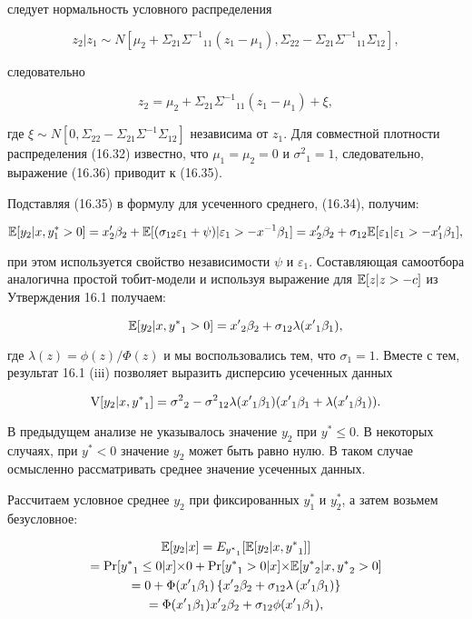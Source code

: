следует нормальность условного распределения

\[
z_2|z_1 \sim N[\mu_2+\Sigma_{21}{\Sigma^{-1}}_{11}(z_{1}-\mu_1),\Sigma_{22}-\Sigma_{21}{\Sigma^{-1}}_{11}\Sigma_{12}],
\]

следовательно

\begin{equation}
z_2=\mu_2+\Sigma_{21}{\Sigma^{-1}}_{11}(z_1-\mu_1)+\xi,
\end{equation}

где $\xi \sim N[0,\Sigma_{22}-\Sigma_{21}{\Sigma^{-1}}\Sigma_{12}]$ независима от $z_1$. Для  совместной плотности распределения (16.32) известно, что $\mu_1=\mu_2=0$ и ${\sigma^{2}}_1=1$, следовательно, выражение (16.36) приводит к  (16.35).

Подставляя (16.35) в формулу для усеченного среднего, (16.34), получим:

\[
\mathbb{E}[y_2|x,y^* _1>0]=x'_2\beta_2+\mathbb{E}[(\sigma_{12}\varepsilon_1+\psi)|\varepsilon_1>-x^{-1}\beta_1]=x'_{2}\beta_2+\sigma_{12}\mathbb{E}[\varepsilon_1|\varepsilon_1>-x'_1\beta_1],
\]
 
при этом используется свойство независимости $\psi$ и $\varepsilon_1$. Составляющая самоотбора  аналогична простой тобит-модели и используя выражение для $\mathbb{E}[z|z>{-c}]$ из Утверждения 16.1 получаем:


\begin{equation}
\mathbb{E}[y_2|x,{y^* }_1>0]={x'}_2\beta_2+\sigma_{12}\lambda({x'}_1\beta_1),
\end{equation}

где $\lambda(z)=\phi(z)/\Phi(z)$ и мы воспользовались тем, что ${\sigma}_1=1$. Вместе с тем, результат 16.1 (iii) позволяет выразить дисперсию усеченных данных

\begin{equation}
\mathrm{V}[y_2|x,{y^* }_1]={\sigma^2}_2-{\sigma^2}_{12}\lambda({x'}_1\beta_1)({x'}_1\beta_1+\lambda({x'}_1\beta_1)).
\end{equation}

В предыдущем анализе не указывалось значение $y_2$ при ${y^* } \leq 0$. В некоторых случаях, при ${y^* }<0$ значение $y_2$ может быть равно нулю. В таком случае осмысленно рассматривать среднее значение усеченных данных. 


Рассчитаем условное среднее $y_2$ при фиксированных $y^* _1$ и $y^* _2$, а затем возьмем безусловное:

\begin{multline}
\mathbb{E}[y_2|x]=E_{{y^* }_1}[\mathbb{E}[y_2|x,{y^* }_1]] \\
=\mathrm{Pr}[ {y^* }_1 \leq 0|x]{\times}0+\mathrm{Pr}[ {y^* }_1>0|x]{\times}\mathbb{E}[{y^* }_2|x,{y^* }_2>0] \\
=0+\Phi({x'}_1\beta_1)\left\lbrace{x'}_2\beta_2+\sigma_{12}\lambda\left({x'}_1\beta_1\right)\right\rbrace \\
=\Phi({x'}_1\beta_1){x'}_2\beta_2+\sigma_{12}\phi({x'}_1\beta_1),
\end{multline}

